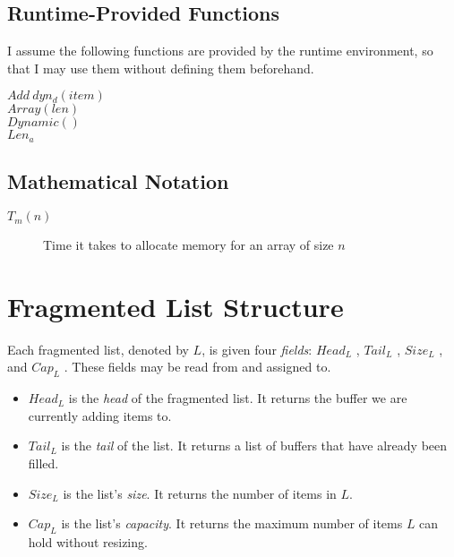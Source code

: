 \documentclass{article}
\newcommand{\head}{
	\ensuremath{Head_L}
}
\newcommand{\tail}{
	\ensuremath{Tail_L}
}
\newcommand{\size}{
	\ensuremath{Size_L}
}
\newcommand{\capacity}{
	\ensuremath{Cap_L}
}
\begin{document}

	\subsection{Runtime-Provided Functions}
	
	I assume the following functions are provided by the runtime environment, so that I may use them without defining them beforehand.\par
	
	\begin{algorithm}\begin{algorithmic}
			\State $Add\ dyn_{d}(item)$
			\\
			\State $Array(len)$
			\\
			\State $Dynamic()$
			\\
			\State $Len_a$
		\end{algorithmic}\end{algorithm}
	
	\subsection{Mathematical Notation}
	
	\begin{description}
		\item[$T_m(n)$] Time it takes to allocate memory for an array of size $n$
	\end{description}
	
	\section{Fragmented List Structure}
	\label{Fragmented List Structure}

	Each fragmented list, denoted by $L$, is given four \textit{fields}: \head, \tail, \size, and \capacity. These fields may be read from and assigned to.
	
	\begin{itemize}
		\item \head is the \textit{head} of the fragmented list. It returns the buffer we are currently adding items to.
		\item \tail is the \textit{tail} of the list. It returns a list of buffers that have already been filled.
		\item \size is the list's \textit{size}. It returns the number of items in $L$.
		\item \capacity is the list's \textit{capacity}. It returns the maximum number of items $L$ can hold without resizing.
	\end{itemize}
	
\end{document}
